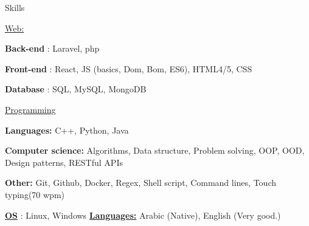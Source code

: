 \documentclass{resume}
\begin{document}
\clearpage


\begin{rSection}{Skills}
    \begin{rSubsection}{\underline{Web:}}{}{}{}
        \item \textbf{Back-end}  : Laravel, php
        \item \textbf{Front-end} : React, JS (basics, Dom, Bom, ES6), HTML4/5, CSS
        \item \textbf{Database}  : SQL, MySQL, MongoDB
    \end{rSubsection}

    \begin{rSubsection}{\underline{Programming}}{}{}{}
        \item \textbf{Languages:} C++, Python, Java
        \item \textbf{Computer science:} Algorithms, Data structure, Problem solving, OOP, OOD, Design patterns, RESTful APIs
        \item \textbf{Other:} Git, Github, Docker, Regex, Shell script, Command lines, Touch typing(70 wpm)
    \end{rSubsection}

    \underline{\bf OS} : Linux, Windows
    \hfill \underline{\bf Languages:} Arabic (Native), English (Very good.) 
\end{rSection}
\end{document}
